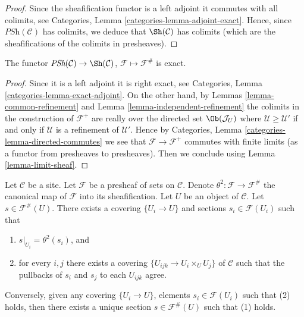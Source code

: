\begin{proof}
Since the sheafification functor is a left adjoint it commutes
with all colimits, see Categories,
Lemma \ref{categories-lemma-adjoint-exact}.
Hence, since $\textit{PSh}(\mathcal{C})$ has colimits, we deduce
that $\Sh(\mathcal{C})$ has colimits (which are the
sheafifications of the colimits in presheaves).
\end{proof}

\begin{lemma}
\label{lemma-sheafification-exact}
The functor $\textit{PSh}(\mathcal{C}) \to \Sh(\mathcal{C})$,
$\mathcal{F} \mapsto \mathcal{F}^\#$ is exact.
\end{lemma}

\begin{proof}
Since it is a left adjoint it is right exact, see
Categories, Lemma \ref{categories-lemma-exact-adjoint}.
On the other hand, by Lemmas \ref{lemma-common-refinement}
and Lemma \ref{lemma-independent-refinement} the colimits
in the construction of $\mathcal{F}^+$ are really over the
directed set $\Ob(\mathcal{J}_U)$ where
$\mathcal{U} \geq \mathcal{U}'$ if and only if
$\mathcal{U}$ is a refinement of $\mathcal{U}'$. Hence by
Categories, Lemma \ref{categories-lemma-directed-commutes}
we see that $\mathcal{F} \to \mathcal{F}^+$ commutes
with finite limits (as a functor from presheaves to
presheaves). Then we conclude using
Lemma \ref{lemma-limit-sheaf}.
\end{proof}

\begin{lemma}
\label{lemma-sections-sheafification}
Let $\mathcal{C}$ be a site.
Let $\mathcal{F}$ be a presheaf of sets on $\mathcal{C}$.
Denote $\theta^2 : \mathcal{F} \to \mathcal{F}^\#$ the canonical
map of $\mathcal{F}$ into its sheafification.
Let $U$ be an object of $\mathcal{C}$.
Let $s \in \mathcal{F}^\#(U)$. There exists
a covering $\{U_i \to U\}$ and sections
$s_i \in \mathcal{F}(U_i)$ such that
\begin{enumerate}
\item $s|_{U_i} = \theta^2(s_i)$, and
\item for every $i, j$ there exists a covering
$\{U_{ijk} \to U_i \times_U U_j\}$ of $\mathcal{C}$ such that
the pullbacks of $s_i$ and $s_j$ to each $U_{ijk}$ agree.
\end{enumerate}
Conversely, given any covering $\{U_i \to U\}$, elements
$s_i \in \mathcal{F}(U_i)$ such that (2) holds, then there
exists a unique section $s \in \mathcal{F}^\#(U)$ such
that (1) holds.
\end{lemma}

